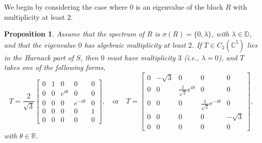 \documentclass[12pt, reqno]{amsart}
\newtheorem{proposition}[theorem]{Proposition}
\theoremstyle{definition}
\theoremstyle{remark}
\numberwithin{equation}{section}
\begin{document}
We begin by considering the case where $0$ is an eigenvalue of the block $R$ with multiplicity at least $2$.
\begin{proposition}\label{Harnack_part_S_5} 
	Assume that the spectrum of $R$ is $\sigma(R)=\{ 0, \lambda \}$, with $\lambda \in \mathbb{D}$, and that the eigenvalue $0$ has algebraic multiplicity at least $2$. If $T\in C_2(\mathbb{C}^5)$ lies in the Harnack part of $S$, then $0$ must have multiplicity $3$ (i.e., $\lambda=0$), and $T$ takes one of the following forms,
	\begin{equation}\label{T case12}
		T=\frac{2}{\sqrt{3}} \begin{bmatrix}
			0 & 1 & 0 & 0 & 0 \\
			0 & 0 & e^{i\theta} & 0 & 0 \\
			0 & 0 & 0 & e^{-i\theta} & 0 \\
			0 & 0 & 0 & 0 & 1 \\
			0 & 0 & 0 & 0 & 0
		\end{bmatrix},\quad \text{or} \quad 
		T=  \begin{bmatrix}
			0 & -\sqrt{3} & 0 & 0 & 0 \\
			0 & 0 & \frac{1}{\sqrt{2}}e^{i\theta} & 0 & 0 \\
			0 & 0 & 0 & \frac{1}{\sqrt{2}}e^{-i\theta} & 0 \\
			0 & 0 & 0 & 0 & -\sqrt{3} \\
			0 & 0 & 0 & 0 & 0
		\end{bmatrix},
	\end{equation} 
	with $\theta \in \mathbb{R}$.	
\end{proposition}
\end{document}
